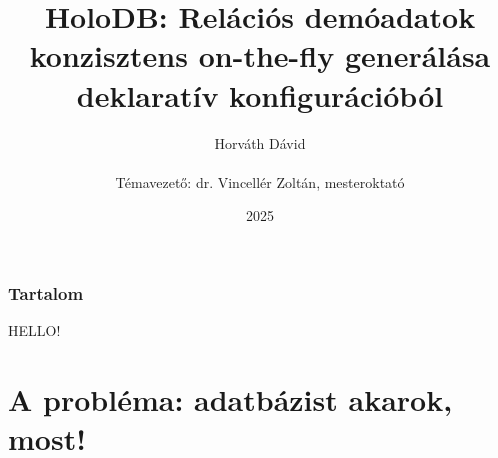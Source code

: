 \documentclass[
    aspectratio=169,
]{beamer}
\title[HoloDB]{HoloDB: Relációs demóadatok konzisztens on-the-fly generálása\\ deklaratív konfigurációból}
\author[Horváth Dávid]{Horváth Dávid \\ ~ \\ { \footnotesize Témavezető: dr. Vincellér Zoltán, mesteroktató }}
\institute[ELTE-IK]{ELTE Informatikai Kar, Információs Rendszerek Tanszék}
\date{2025}
\begin{document}
\beamertemplatenavigationsymbolsempty

\begin{frame}
    \titlepage
\end{frame}

\begin{frame}
    \frametitle{Tartalom}
    \hfill
    
    \begin{minipage}[c]{0.63\textwidth}
        \parbox[t]{.95\textwidth}{
            \begin{minipage}[c][0.6\textheight]{\textwidth}
            \tableofcontents
            \end{minipage}
        }
    \end{minipage}%
    \hspace*{\fill}%
    \begin{minipage}[c]{0.35\textwidth}
        HELLO!
    \end{minipage}%
\end{frame}

\section{A probléma: adatbázist akarok, most!}
\def\sectionshorttitle{\arabic{section}. A probléma}
\end{document}
